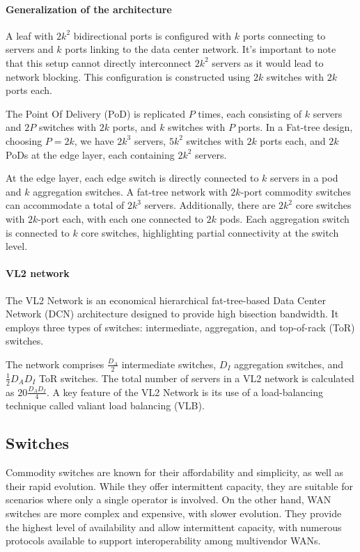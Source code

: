 \paragraph*{Generalization of the architecture}
A leaf with $2k^2$ bidirectional ports is configured with $k$ ports connecting to servers and $k$ ports linking to the data center network. 
It's important to note that this setup cannot directly interconnect $2k^2$ servers as it would lead to network blocking. 
This configuration is constructed using $2k$ switches with $2k$ ports each.

The Point Of Delivery (PoD) is replicated $P$ times, each consisting of $k$ servers and $2P$ switches with $2k$ ports, and $k$ switches with $P$ ports. 
In a Fat-tree design, choosing $P=2k$, we have $2k^3$ servers, $5k^2$ switches with $2k$ ports each, and $2k$ PoDs at the edge layer, each containing $2k^2$ servers.

At the edge layer, each edge switch is directly connected to $k$ servers in a pod and $k$ aggregation switches. 
A fat-tree network with $2k$-port commodity switches can accommodate a total of $2k^3$ servers. 
Additionally, there are $2k^2$ core switches with $2k$-port each, with each one connected to $2k$ pods. 
Each aggregation switch is connected to $k$ core switches, highlighting partial connectivity at the switch level.

\paragraph*{VL2 network}

The VL2 Network is an economical hierarchical fat-tree-based Data Center Network (DCN) architecture designed to provide high bisection bandwidth. 
It employs three types of switches: intermediate, aggregation, and top-of-rack (ToR) switches.

The network comprises $\frac{D_A}{2}$ intermediate switches, $D_I$ aggregation switches, and $\frac{1}{2}D_A D_I$ ToR switches. 
The total number of servers in a VL2 network is calculated as $20\frac{D_A D_I}{4}$. 
A key feature of the VL2 Network is its use of a load-balancing technique called valiant load balancing (VLB).

\subsection{Switches}
Commodity switches are known for their affordability and simplicity, as well as their rapid evolution. 
While they offer intermittent capacity, they are suitable for scenarios where only a single operator is involved. 
On the other hand, WAN switches are more complex and expensive, with slower evolution. 
They provide the highest level of availability and allow intermittent capacity, with numerous protocols available to support interoperability among multivendor WANs.

